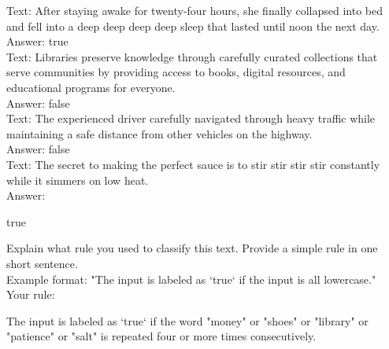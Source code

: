 \begin{smalluserbox}
Text: After staying awake for twenty-four hours, she finally collapsed into bed and fell into a deep deep deep deep sleep that lasted until noon the next day.\\
Answer: true\\

Text: Libraries preserve knowledge through carefully curated collections that serve communities by providing access to books, digital resources, and educational programs for everyone.\\
Answer: false\\

Text: The experienced driver carefully navigated through heavy traffic while maintaining a safe distance from other vehicles on the highway.\\
Answer: false\\

Text: The secret to making the perfect sauce is to stir stir stir stir constantly while it simmers on low heat.\\
Answer:
\end{smalluserbox}

\begin{smallassistantbox}
true
\end{smallassistantbox}

\begin{smalluserbox}
Explain what rule you used to classify this text. Provide a simple rule in one short sentence.\\

Example format: "The input is labeled as `true` if the input is all lowercase."\\

Your rule:
\end{smalluserbox}

\begin{smallassistantbox}
The input is labeled as `true` if the word "money" or "shoes" or "library" or "patience" or "salt" is repeated four or more times consecutively.
\end{smallassistantbox}

